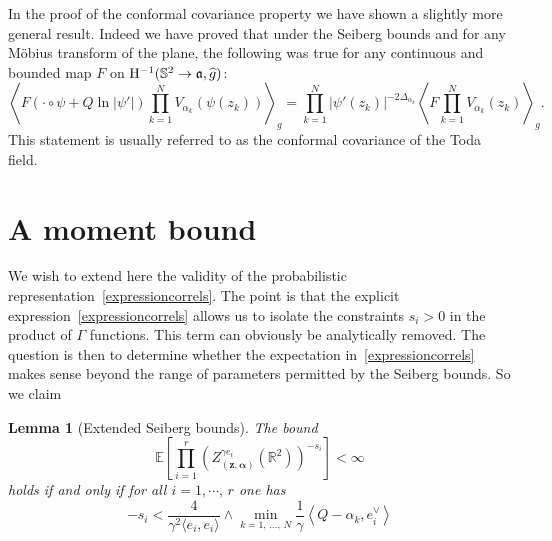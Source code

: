 \documentclass[10pt]{amsart}
\newtheorem{lemm}[theo]{Lemma}\newtheorem{prop}[theo]{Proposition}\newtheorem{coro}[theo]{Corollary}\newtheorem{conj}[theo]{Conjecture}
\theoremstyle{definition}\newtheorem{defi}[theo]{Definition}\newtheorem{rema}[theo]{Remark}\newtheorem{exam}[theo]{Example}\newtheorem{exem}[theo]{Example}\newtheorem{nota}[theo]{Notation}
\newcommand{\frka}{\mathfrak{a}}
\newcommand{\rmH}{\mathrm{H}}
\newcommand{\R}{\mathbb{R}}
\renewcommand*\S{\mathbb{S}}
\newcommand{\E}{\mathbb{E}}
\newcommand{\ps}[1]{\langle #1 \rangle}
\newcommand{\norm}[1]{\left\lvert#1\right\rvert}
\let\oldhat\hat
\renewcommand*{\hat}[1]{\mathchoice{\widehat{#1}}{\widehat{#1}}{\oldhat{#1}}{\oldhat{#1}}}
\begin{document}
In the proof of the conformal covariance property we have shown a slightly more general result. Indeed we have proved that under the Seiberg bounds and for any M\"obius transform of the plane, the following was true for any continuous and bounded map $F$ on $\rmH^{-1}(\S^2\to\frka,\hat g)$:
\begin{equation}
\left\langle F\left(\cdot\circ\psi+Q\ln\norm{\psi'}\right)\prod_{k=1}^NV_{\alpha_k}(\psi(z_k))\right\rangle_g=\prod_{k=1}^N\left|\psi'(z_k)\right|^{-2\Delta_{\alpha_k}}\left\langle F\prod_{k=1}^NV_{\alpha_k}(z_k)\right\rangle_{g}.
\end{equation}
This statement is usually referred to as the conformal covariance of the Toda field.



\section{A moment bound}\label{section:moment}


We wish to extend here the validity of the probabilistic representation~\eqref{expressioncorrels}. The point is that the explicit expression~\eqref{expressioncorrels} allows us to isolate the constraints $s_i>0$ in the product of $\Gamma$ functions. This term can obviously be analytically removed. The question is then to determine whether the expectation in~\eqref{expressioncorrels} makes sense beyond the range of parameters permitted by the Seiberg bounds. So we claim

\begin{lemm}[Extended Seiberg bounds]\label{lemmaSeibergplus}
The bound
\begin{equation}\label{expectunit}
\E \left [\prod_{i=1}^{r} \left(Z_{\left(\bm z,\bm \alpha\right)}^{\gamma e_i} \left(\R^2\right)\right)^{- s_i} \right] < \infty
\end{equation}
holds if and only if for all $i=1,\cdots,\,r$ one has
\begin{equation}\label{extSeiberg}
-s_i < \frac{4}{\gamma^2\ps{e_i,e_i}}\wedge \min_{k=1,\,\dots,\,N} \frac{1}{\gamma}\left\langle Q-\alpha_k,e_i^\vee\right\rangle
\end{equation}
\end{lemm}
\end{document}
